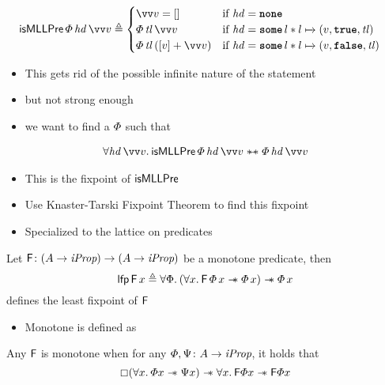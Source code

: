 \documentclass[thesis.tex]{subfiles}
\begin{document}
\begin{align*}
  \textlog{isMLLPre}\, \pred\, \langv{hd}\, \vect{v} & \eqdef
  \begin{cases}
    \vect{v} = []                         & \text{if } \langv{hd} = \None                                        \\
    \pred\, \langv{tl}\, \vect{v}         & \text{if } \langv{hd} = \Some l * l \fmapsto (v, \True, \langv{tl})  \\
    \pred\, \langv{tl}\, ([v] + \vect{v}) & \text{if } \langv{hd} = \Some l * l \fmapsto (v, \False, \langv{tl})
  \end{cases}
\end{align*}
\begin{itemize}
  \item This gets rid of the possible infinite nature of the statement
  \item but not strong enough
  \item we want to find a $\varPhi$ such that
\end{itemize}
\begin{align*}
  \All \langv{hd}\, \vect{v}. \textlog{isMLLPre}\, \pred\, \langv{hd}\, \vect{v} \wandIff \pred\, \langv{hd}\, \vect{v}
\end{align*}
\begin{itemize}
  \item This is the fixpoint of $\textsf{\upshape isMLLPre}$
  \item Use Knaster-Tarski Fixpoint Theorem to find this fixpoint \cite*{tarskiLatticetheoreticalFixpointTheorem1955}
  \item Specialized to the lattice on predicates
\end{itemize}
\begin{theorem}
  \label{thm:tarski}
  Let $\textsf{\upshape F}\colon (A \to \textit{iProp}) \to (A \to \textit{iProp})$ be a monotone predicate, then
  \[\lfp\, \hopred\, \var \eqdef \All \Phi. (\All \var. \hopred\, \pred\, \var \wand \pred\, \var) \wand \pred \, \var\]
  defines the least fixpoint of $\textsf{\upshape F}$
\end{theorem}
\begin{itemize}
  \item Monotone is defined as
\end{itemize}
\begin{definition}
  Any $\textsf{\upshape F}$ is monotone when for any $\varPhi, \Psi\colon A \to \textit{iProp}$, it holds that
  \[\always(\All \var. \pred\var \wand \predB\var) \wand \All \var. \hopred\pred\var \wand \hopred\pred\var\]
\end{definition}
\end{document}
